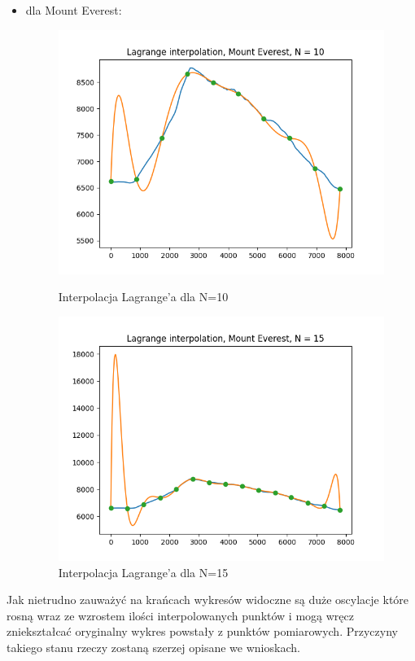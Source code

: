 \documentclass{article}
\begin{document}
\begin{itemize}
    \item dla Mount Everest:
    \begin{figure}[!htb]
      \includegraphics[width=\linewidth]{Mount_Everest_Lagrange_N_10.png}
      \caption{Interpolacja Lagrange'a dla N=10}
    \endminipage\hfill
      \includegraphics[width=\linewidth]{Mount_Everest_Lagrange_N_15.png}
      \caption{Interpolacja Lagrange'a dla N=15}
    \endminipage\hfill
    \end{figure}
    
\end{itemize}

Jak nietrudno zauważyć na krańcach wykresów widoczne są duże oscylacje które rosną wraz ze wzrostem ilości interpolowanych punktów i mogą
wręcz zniekształcać oryginalny wykres powstały z punktów pomiarowych. Przyczyny takiego stanu rzeczy zostaną szerzej opisane we wnioskach.
\end{document}
